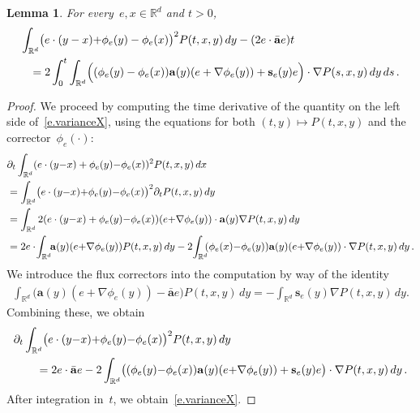 \documentclass[11pt]{article} %
\numberwithin{equation}{section}
\newtheorem{lemma}[theorem]{Lemma}
\theoremstyle{definition}
\newcommand*{\Rd}{\ensuremath{\mathbb{R}^d}}
\renewcommand{\a}{\mathbf{a}}
\newcommand{\ahom}{\bar{\a}}
\begin{document}
\begin{lemma}
\label{l.varianceX}
For every~$e, x \in\Rd$ and $t >0$, 
\begin{align}
\label{e.varianceX}
\lefteqn{
\int_{\Rd} 
\bigl(e \cdot (y-x) {+}\phi_{e}(y) - \phi_e(x) \bigr)^2 P(t,x,y)\,dy 
-
(2 e\cdot \ahom e) t
} 
\ \ 
& 
\notag \\ &
=
2 \int_0^{t}   
\int_{\Rd}   
\Bigl( ( \phi_e(y) - \phi_e(x) )
\a(y)(e+\nabla \phi_{e}(y)) 
+ 
\mathbf{s}_e (y) e\Bigr)\cdot
\nabla P(s ,x,y)\,dy 
\,ds\,.
\end{align}
\end{lemma}
\begin{proof}
We proceed by computing the time derivative of the quantity on the left side of~\eqref{e.varianceX}, using the equations for both $(t,y) \mapsto P(t,x,y)$ and the corrector~$\phi_e(\cdot)$:
\begin{align*}
\lefteqn{
\partial_t \int_{\Rd} 
(e \cdot (y{-}x)+\phi_{e}(y) {-} \phi_e(x))^2 
P(t,x,y)\,dx
}  & 
\\ &
=
\int_{\Rd} 
\bigl(e \cdot (y{-}x) {+}\phi_{e}(y) {-} \phi_e(x) \bigr)^2 
\partial_t P(t,x,y)\,dy
\\ & 
=
\int_{\Rd} 
2 (e \cdot (y{-}x)+\phi_{e}(y) {-} \phi_e(x) )
(e {+} \nabla \phi_e(y)) 
\cdot
\a(y)
\nabla P(t,x,y)\,dy
\\ & 
=
2e \cdot \!
\int_{\Rd} \!\!
\a (y)(e {+} \nabla \phi_e(y)) P(t,x,y)\,dy
-
2 \!\int_{\Rd} \!\!
(\phi_e(x) {-} \phi_e(y))
\a(y) (e {+} \nabla \phi_{e}(y)) 
\cdot 
\nabla P(t,x,y) \,dy\,.
\end{align*}
We introduce the flux correctors into the computation by way of the identity
\begin{align*}
\int_{\Rd} 
\bigl( 
\a (y) (e {+} \nabla \phi_{e}(y)) -\ahom e \bigr)
P(t,x,y)\,dy
=
-\int_{\Rd} 
\mathbf{s}_{e} (y) \nabla P(t,x,y)\,dy.
\end{align*}
Combining these, we obtain
\begin{align*}
\lefteqn{
\partial_t \int_{\Rd} 
\bigl(e \cdot (y{-} x) {+} \phi_{e}(y) {-} \phi_e(x) \bigr)^2 
P(t,x,y)\,dy
} \qquad & 
\\ & 
=
2e\cdot \ahom e 
-
2 \int_{\Rd} 
\bigl( ( \phi_e(y) {-} \phi_e(x) )
\a (y)(e {+} \nabla \phi_{e}(y)) 
+\mathbf{s}_e (y) e\bigr)
\cdot
\nabla P(t,x,y)\,dy
\,.
\end{align*}
After integration in~$t$, we obtain~\eqref{e.varianceX}.
\end{proof} 
\end{document}
